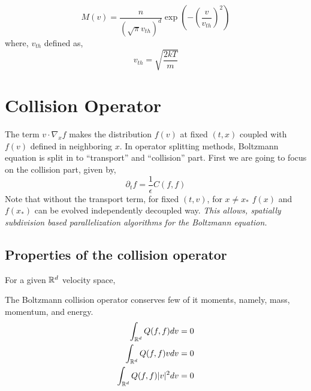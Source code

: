 \documentclass{article}
\begin{document}
\begin{equation}
M(v) = \frac{n}{(\sqrt{\pi}v_{th})^d} \exp{(-(\frac{v}{v_{th}})^2)}    
\end{equation} where, $v_{th}$ defined as, 
\begin{equation}
    v_{th} = \sqrt{\frac{2kT}{m}}
\end{equation}




\section{Collision Operator}
\label{sec:collision_operator}
The term $v\cdot \nabla_x f$ makes the distribution $f(v)$ at fixed $(t,x)$ coupled with $f(v)$ defined in neighboring $x$. In operator splitting methods, Boltzmann equation is split in to ``transport'' and ``collision'' part. First we are going to focus on the collision part, given by, 
\begin{equation}
    \partial_t f = \frac{1}{\epsilon}C(f,f) \label{eq:col_op}
\end{equation}
Note that without the transport term, for fixed $(t,v)$, for $x\neq x_*$ $f(x)$ and $f(x_*)$ can be evolved independently decoupled way. \emph{This allows, spatially subdivision based parallelization algorithms for the Boltzmann equation.}

\subsection{Properties of the collision operator}
\label{subsec:collision_op_properties}
For a given $\mathbb{R}^d$ velocity space,
\begin{theorem}
    The Boltzmann collision operator conserves few of it moments, namely, mass, momentum, and energy.
    \begin{align}
        \int_{\mathbb{R}^d} Q(f,f) dv  = 0 \\
        \int_{\mathbb{R}^d} Q(f,f) v dv  = 0 \\
        \int_{\mathbb{R}^d} Q(f,f) |v|^2dv  = 0 \\
    \end{align}
\end{theorem}

\end{document}
